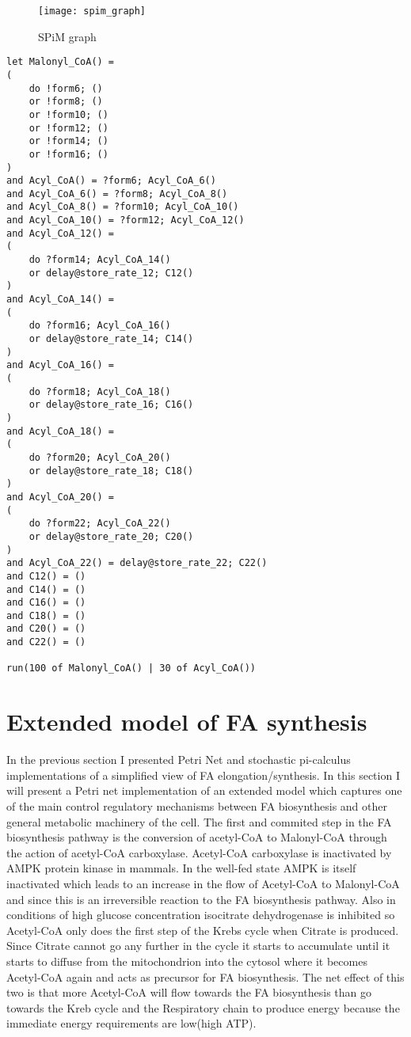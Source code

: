 \begin{figure}[htbp!]
\centering
\texttt{[image: spim\_graph]}
\caption[SPiM graph]{SPiM graph}
\label{fig:spim_graph}
\end{figure}

\begin{verbatim}
let Malonyl_CoA() =
(
	do !form6; ()
	or !form8; ()
	or !form10; ()
	or !form12; ()
	or !form14; ()
	or !form16; ()
)
and Acyl_CoA() = ?form6; Acyl_CoA_6()
and Acyl_CoA_6() = ?form8; Acyl_CoA_8()
and Acyl_CoA_8() = ?form10; Acyl_CoA_10()
and Acyl_CoA_10() = ?form12; Acyl_CoA_12()
and Acyl_CoA_12() =
(
	do ?form14; Acyl_CoA_14()
	or delay@store_rate_12; C12()
)
and Acyl_CoA_14() =
(
	do ?form16; Acyl_CoA_16()
	or delay@store_rate_14; C14()
)
and Acyl_CoA_16() =
(
	do ?form18; Acyl_CoA_18()
	or delay@store_rate_16; C16()
)
and Acyl_CoA_18() =
(
	do ?form20; Acyl_CoA_20()
	or delay@store_rate_18; C18()
)
and Acyl_CoA_20() =
(
	do ?form22; Acyl_CoA_22()
	or delay@store_rate_20; C20()
)
and Acyl_CoA_22() = delay@store_rate_22; C22()
and C12() = ()
and C14() = ()
and C16() = ()
and C18() = ()
and C20() = ()
and C22() = ()

run(100 of Malonyl_CoA() | 30 of Acyl_CoA())
\end{verbatim}


\section{Extended model of FA synthesis}
In the previous section I presented Petri Net and stochastic
pi-calculus implementations of a
simplified view of FA elongation/synthesis. In this section I
will present a Petri net implementation of an extended model which
captures one of the main control regulatory mechanisms between FA
biosynthesis and other general metabolic
machinery of the cell. The first and commited step in the FA
biosynthesis pathway is the conversion of acetyl-CoA to Malonyl-CoA
through the action of acetyl-CoA carboxylase. Acetyl-CoA carboxylase
is inactivated by AMPK protein kinase in mammals. In the well-fed
state AMPK is itself inactivated which leads to an increase in the
flow of Acetyl-CoA to Malonyl-CoA and since this is an irreversible
reaction to the FA biosynthesis pathway.
Also in conditions of high glucose
concentration isocitrate dehydrogenase is inhibited so Acetyl-CoA only
does the first step of the Krebs cycle when Citrate is produced. Since
Citrate cannot go any further in the cycle it starts to accumulate
until it starts to diffuse from the mitochondrion into the cytosol
where it becomes Acetyl-CoA again and acts as precursor for FA
biosynthesis. The net effect of this two is that more Acetyl-CoA will
flow towards the FA biosynthesis than go towards the
Kreb cycle and the Respiratory chain to produce energy because the
immediate energy requirements are low(high ATP).

